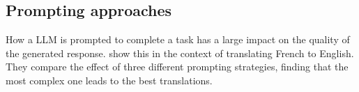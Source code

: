 \subsection{Prompting approaches}\label{sec:prompting-approaches}
How a LLM is prompted to complete a task has a large impact on the quality of the generated response.
\cite{reynolds:2021:Prompt} show this in the context of translating French to English.
They compare the effect of three different prompting strategies, finding that the most complex one leads to the best translations.

